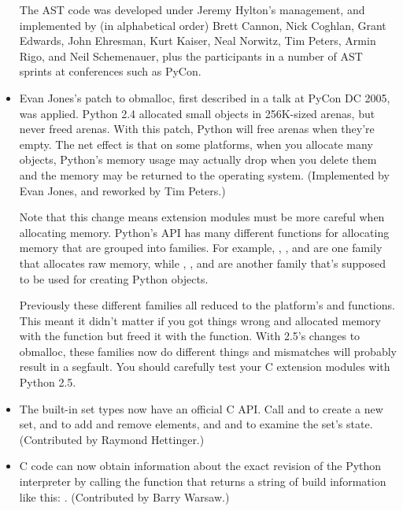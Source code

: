\documentclass{howto}
\begin{document}
\begin{itemize}
The AST code was developed under Jeremy Hylton's management, and
implemented by (in alphabetical order) Brett Cannon, Nick Coghlan,
Grant Edwards, John Ehresman, Kurt Kaiser, Neal Norwitz, Tim Peters,
Armin Rigo, and Neil Schemenauer, plus the participants in a number of
AST sprints at conferences such as PyCon.
 
\item Evan Jones's patch to obmalloc, first described in a talk
at PyCon DC 2005, was applied.  Python 2.4 allocated small objects in
256K-sized arenas, but never freed arenas.  With this patch, Python
will free arenas when they're empty.  The net effect is that on some
platforms, when you allocate many objects, Python's memory usage may
actually drop when you delete them and the memory may be returned to
the operating system.  (Implemented by Evan Jones, and reworked by Tim
Peters.)

Note that this change means extension modules must be more careful
when allocating memory.  Python's API has many different
functions for allocating memory that are grouped into families.  For
example, , , and
 are one family that allocates raw memory,
while , ,
and  are another family that's supposed to
be used for creating Python objects.  

Previously these different families all reduced to the platform's
 and  functions.  This meant 
it didn't matter if you got things wrong and allocated memory with the
 function but freed it with the 
function.  With 2.5's changes to obmalloc, these families now do different
things and mismatches will probably result in a segfault.  You should
carefully test your C extension modules with Python 2.5.

\item The built-in set types now have an official C API.  Call
 and  to create a
new set,  and  to
add and remove elements, and  and
 to examine the set's state.
(Contributed by Raymond Hettinger.)

\item C code can now obtain information about the exact revision
of the Python interpreter by calling the 
 function that returns a 
string of build information like this:
.  
(Contributed by Barry Warsaw.)


\end{itemize}
\end{document}

